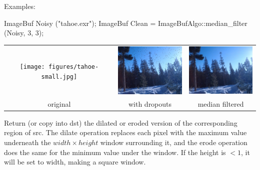 \smallskip
\noindent Examples:
\begin{code}
    ImageBuf Noisy ("tahoe.exr");
    ImageBuf Clean = ImageBufAlgo::median_filter (Noisy, 3, 3);
\end{code}

\spc \begin{tabular}{ccc}
\texttt{[image: figures/tahoe-small.jpg]} &
\includegraphics[width=1.5in]{figures/tahoe-pepper.jpg} &
\includegraphics[width=1.5in]{figures/tahoe-pepper-median.jpg} \\
original & with dropouts & median filtered \\
\end{tabular}

\apiend


 
 

Return (or copy into {\cf dst}) the dilated or eroded version of the
corresponding region of {\cf src}.  The dilate operation replaces each pixel
with the maximum value underneath the $\mathit{width} \times \mathit{height}$
window surrounding it, and the erode operation does the same for the minimum
value under the window. If the height is $< 1$, it will be set to width,
making a square window.

